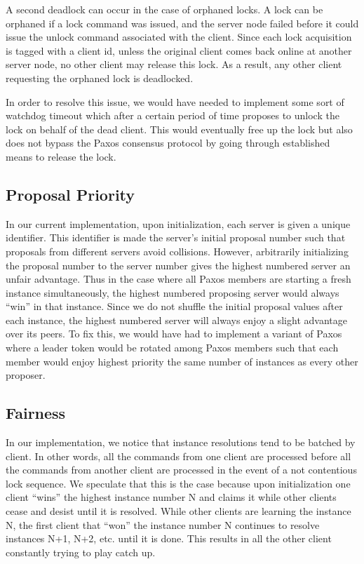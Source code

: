 \documentclass{article}
\begin{document}
A second deadlock can occur in the case of orphaned locks.
A lock can be orphaned if a lock command was issued, and the server node failed before it could issue the unlock command associated with the client.
Since each lock acquisition is tagged with a client id, unless the original client comes back online at another server node, no other client may release this lock.
As a result, any other client requesting the orphaned lock is deadlocked.

In order to resolve this issue, we would have needed to implement some sort of watchdog timeout which after a certain period of time proposes to unlock the lock on behalf of the dead client.
This would eventually free up the lock but also does not bypass the Paxos consensus protocol by going through established means to release the lock.

\subsection{Proposal Priority}

In our current implementation, upon initialization, each server is given a unique identifier.
This identifier is made the server's initial proposal number such that proposals from different servers avoid collisions.
However, arbitrarily initializing the proposal number to the server number gives the highest numbered server an unfair advantage.
Thus in the case where all Paxos members are starting a fresh instance simultaneously, the highest numbered proposing server would always ``win'' in that instance.
Since we do not shuffle the initial proposal values after each instance, the highest numbered server will always enjoy a slight advantage over its peers.
To fix this, we would have had to implement a variant of Paxos where a leader token would be rotated among Paxos members such that each member would enjoy highest priority the same number of instances as every other proposer.

\subsection{Fairness}

In our implementation, we notice that instance resolutions tend to be batched by client. In other words, all the commands from one client are processed before all the commands from another client are processed in the event of a not contentious lock sequence. We speculate that this is the case because upon initialization one client ``wins'' the highest instance number N and claims it while other clients cease and desist until it is resolved. While other clients are learning the instance N, the first client that ``won'' the instance number N continues to resolve instances N+1, N+2, etc. until it is done. This results in all the other client constantly trying to play catch up.
\end{document}

